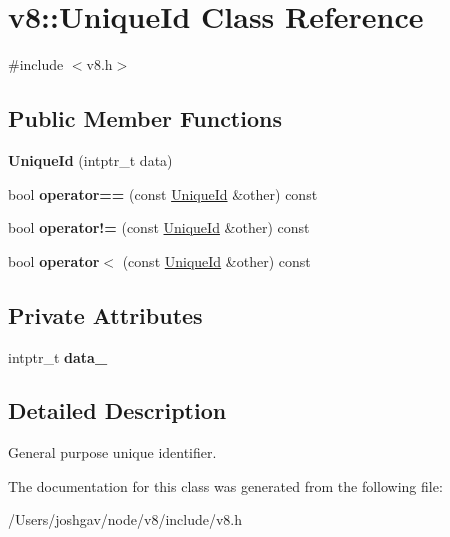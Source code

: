 \hypertarget{classv8_1_1_unique_id}{}\section{v8\+:\+:Unique\+Id Class Reference}
\label{classv8_1_1_unique_id}


{\ttfamily \#include $<$v8.\+h$>$}

\subsection*{Public Member Functions}
\begin{DoxyCompactItemize}
\item 
{\bfseries Unique\+Id} (intptr\+\_\+t data)\hypertarget{classv8_1_1_unique_id_a94ba72efbc70dee13184b444c3d2399a}{}\label{classv8_1_1_unique_id_a94ba72efbc70dee13184b444c3d2399a}

\item 
bool {\bfseries operator==} (const \hyperlink{classv8_1_1_unique_id}{Unique\+Id} \&other) const \hypertarget{classv8_1_1_unique_id_a157844a8c7cbeb43282670f7a233e1d0}{}\label{classv8_1_1_unique_id_a157844a8c7cbeb43282670f7a233e1d0}

\item 
bool {\bfseries operator!=} (const \hyperlink{classv8_1_1_unique_id}{Unique\+Id} \&other) const \hypertarget{classv8_1_1_unique_id_a16bdf3163cdacfaabed5cc253d948c10}{}\label{classv8_1_1_unique_id_a16bdf3163cdacfaabed5cc253d948c10}

\item 
bool {\bfseries operator$<$} (const \hyperlink{classv8_1_1_unique_id}{Unique\+Id} \&other) const \hypertarget{classv8_1_1_unique_id_a189ed3914fea0157f00892b5e8f081f3}{}\label{classv8_1_1_unique_id_a189ed3914fea0157f00892b5e8f081f3}

\end{DoxyCompactItemize}
\subsection*{Private Attributes}
\begin{DoxyCompactItemize}
\item 
intptr\+\_\+t {\bfseries data\+\_\+}\hypertarget{classv8_1_1_unique_id_a129f157fb2e36618a71649b3676edb30}{}\label{classv8_1_1_unique_id_a129f157fb2e36618a71649b3676edb30}

\end{DoxyCompactItemize}


\subsection{Detailed Description}
General purpose unique identifier. 

The documentation for this class was generated from the following file\+:\begin{DoxyCompactItemize}
\item 
/\+Users/joshgav/node/v8/include/v8.\+h\end{DoxyCompactItemize}
